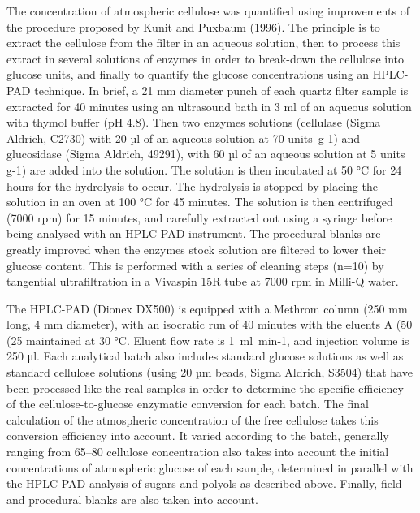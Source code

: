 The concentration of atmospheric cellulose was quantified using improvements of the
procedure proposed by Kunit and Puxbaum (1996). The principle is to extract the cellulose
from the filter in an aqueous solution, then to process this extract in several solutions
of enzymes in order to break-down the cellulose into glucose units, and finally to
quantify the glucose concentrations using an HPLC-PAD technique. In brief, a 21 mm
diameter punch of each quartz filter sample is extracted for 40 minutes using an
ultrasound bath in 3 ml of an aqueous solution with thymol buffer (pH 4.8). Then two
enzymes solutions (cellulase (Sigma Aldrich, C2730) with 20 µl of an aqueous solution at
70 units g-1) and glucosidase (Sigma Aldrich, 49291), with 60 µl of an aqueous solution at
5 units g-1) are added into the solution. The solution is then incubated at 50 °C for 24
hours for the hydrolysis to occur. The hydrolysis is stopped by placing the solution in an
oven at 100 °C for 45 minutes. The solution is then centrifuged (7000 rpm) for 15 minutes,
and carefully extracted out using a syringe before being analysed with an HPLC-PAD
instrument. The procedural blanks are greatly improved when the enzymes stock solution are
filtered to lower their glucose content. This is performed with a series of cleaning steps
(n=10) by tangential ultrafiltration in a Vivaspin 15R tube at 7000 rpm in Milli-Q water.

The HPLC-PAD (Dionex DX500) is equipped with a Methrom column (250 mm long, 4 mm
diameter), with an isocratic run of 40 minutes with the eluents A (50%
(25%
maintained at 30 °C. Eluent flow rate is 1 ml min-1, and injection volume is 250 μl. Each
analytical batch also includes standard glucose solutions as well as standard cellulose
solutions (using 20 µm beads, Sigma Aldrich, S3504) that have been processed like the real
samples in order to determine the specific efficiency of the cellulose-to-glucose
enzymatic conversion for each batch. The final calculation of the atmospheric
concentration of the free cellulose takes this conversion efficiency into account. It
varied according to the batch, generally ranging from 65–80%
cellulose concentration also takes into account the initial concentrations of atmospheric
glucose of each sample, determined in parallel with the HPLC-PAD analysis of sugars and
polyols as described above. Finally, field and procedural blanks are also taken into
account.

